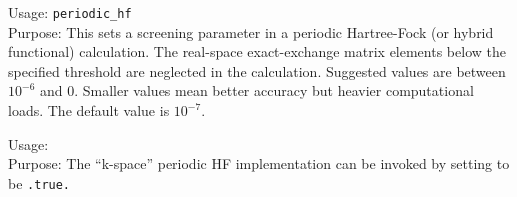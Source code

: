 { \noindent
  Usage: \texttt{periodic\_hf}   \\[1.0ex]
  Purpose: This sets a screening parameter in a periodic Hartree-Fock (or hybrid 
  functional) calculation. The real-space exact-exchange matrix elements below the specified
  threshold  are neglected in the calculation. Suggested values are between
  $10^{-6}$ and 0. Smaller values mean better accuracy but heavier computational loads.
  The default value is $10^{-7}$.
}

{ \noindent
  Usage:   \\[1.0ex]
  Purpose: The ``k-space'' periodic HF implementation can be invoked
  by setting  to be \texttt{.true.}
}
